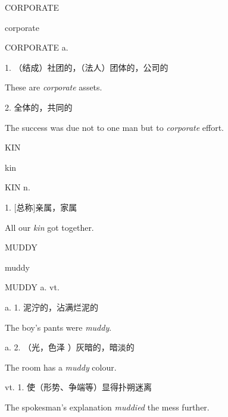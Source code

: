 \begin{flashcard}{
CORPORATE

corporate
}
\begin{center}
CORPORATE a. 
\end{center}
1. （结成）社团的，（法人）团体的，公司的

These are \textit{corporate} assets.

2. 全体的，共同的

The success was due not to one man but to \textit{corporate} effort.

\end{flashcard}
\begin{flashcard}{
KIN

kin
}
\begin{center}
KIN n. \textipa{[kin]}
\end{center}
1. [总称]亲属，家属

All our \textit{kin} got together.

\end{flashcard}
\begin{flashcard}{
MUDDY

muddy
}
\begin{center}
MUDDY a. vt. 
\end{center}
a. 1. 泥泞的，沾满烂泥的

The boy's pants were \textit{muddy}.

a. 2. （光，色泽 ）灰暗的，暗淡的

The room has a \textit{muddy} colour.

vt. 1. 使（形势、争端等）显得扑朔迷离

The spokesman's explanation \textit{muddied} the mess further.

\end{flashcard}
